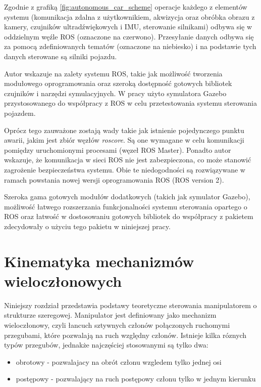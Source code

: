 \documentclass[a4paper, 12pt, twoside]{article}
\begin{document}
\begin{itemize}
Zgodnie z grafiką \ref{fig:autonomous_car_scheme} operacje każdego z elementów systemu (komunikacja zdalna z użytkownikiem, akwizycja oraz obróbka obrazu z kamery, czujników ultradźwiękowych i IMU, sterowanie silnikami) odbywa się w oddzielnym węźle ROS (oznaczone na czerwono). Przesyłanie danych odbywa się za pomocą zdefiniowanych tematów (oznaczone na niebiesko) i na podstawie tych danych sterowane są silniki pojazdu.

Autor wskazuje na zalety systemu ROS, takie jak możliwość tworzenia modułowego oprogramowania oraz szeroką dostępność gotowych bibliotek czujników i narzędzi symulacyjnych. W pracy użyto symulatora Gazebo przystosowanego do współpracy z ROS w celu przetestowania systemu sterowania pojazdem. 

Oprócz tego zauważone zostają wady takie jak istnienie pojedynczego punktu awarii, jakim jest zbiór węzłów \textit{roscore}. Są one wymagane w celu komunikacji pomiędzy uruchomionymi procesami (węzeł ROS Master). Ponadto autor wskazuje, że komunikacja w sieci ROS nie jest zabezpieczona, co może stanowić zagrożenie bezpieczeństwa systemu. Obie te niedogodności są rozwiązywane w ramach powstania nowej wersji oprogramowania ROS (ROS version 2).

\end{itemize}

Szeroka gama gotowych modułów dodatkowych (takich jak symulator Gazebo), możliwość łatwego rozszerzania funkcjonalności systemu sterowania opartego o ROS oraz łatwość w dostosowaniu gotowych bibliotek do współpracy z pakietem zdecydowały o użyciu tego pakietu w niniejszej pracy. 

\cleardoublepage
\newpage
\vspace*{1.5 cm}
\section{Kinematyka mechanizmów wieloczłonowych}
\vspace{1.5 cm}
Niniejszy rozdział przedstawia podstawy teoretyczne sterowania manipulatorem o strukturze szeregowej. Manipulator jest definiowany jako mechanizm wieloczłonowy, czyli łancuch sztywnych członów połączonych ruchomymi przegubami, które pozwalają na ruch względny członów. Istnieje kilka róznych typów przegubów, jednakże najczęściej stosowanymi są tylko dwa:

\begin{itemize}
\item obrotowy - pozwalajacy na obrót członu wzgledem tylko jednej osi
\item postępowy - pozwalający na ruch postępowy członu tylko w jednym kierunku
\end{itemize}
\end{document}
